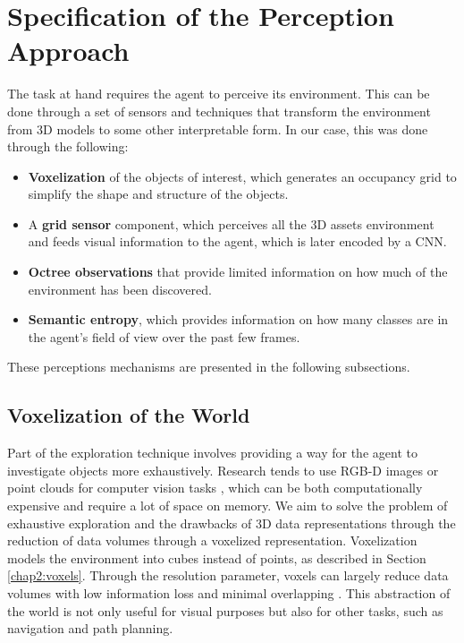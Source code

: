 \section{Specification of the Perception Approach}
The task at hand requires the agent to perceive its environment. This can be done through a set of sensors and techniques that transform the environment from 3D models to some other interpretable form. In our case, this was done through the following:
\begin{itemize}
    \item \textbf{Voxelization} of the objects of interest, which generates an occupancy grid to simplify the shape and structure of the objects.
    \item A \textbf{grid sensor} component, which perceives all the 3D assets environment and feeds visual information to the agent, which is later encoded by a CNN.
    \item \textbf{Octree observations} that provide limited information on how much of the environment has been discovered.
    \item \textbf{Semantic entropy}, which provides information on how many classes are in the agent's field of view over the past few frames.
\end{itemize}
These perceptions mechanisms are presented in the following subsections.

\subsection{Voxelization of the World}
Part of the exploration technique involves providing a way for the agent to investigate objects more exhaustively. 
Research tends to use RGB-D images or point clouds for computer vision tasks \cite{xie2020linking, huang2021comprehensive}, which can be both computationally expensive and require a lot of space on memory.
We aim to solve the problem of exhaustive exploration and the drawbacks of 3D data representations through the reduction of data volumes through a voxelized representation. Voxelization models the environment into cubes instead of points, as described in Section \ref{chap2:voxels}. Through the resolution parameter, voxels can largely reduce data volumes with low information loss and minimal overlapping \cite{xie2020linking}. This abstraction of the world is not only useful for visual purposes but also for other tasks, such as navigation and path planning.



